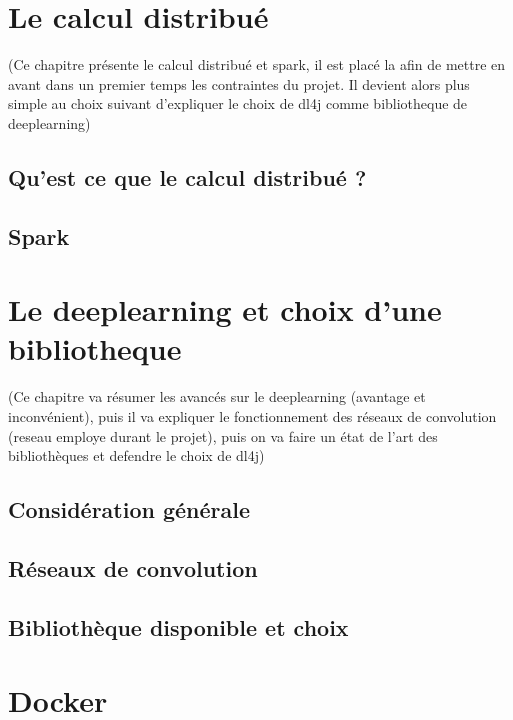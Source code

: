 \documentclass[a4paper,10pt,openany,oneside]{sphinxmanual}
\begin{document}
\section{Le calcul distribué}
\label{index:le-calcul-distribue}
(Ce chapitre présente le calcul distribué et spark, il est placé la afin de mettre en avant dans un
premier temps les contraintes du projet. Il devient alors plus simple au choix suivant d'expliquer le
choix de dl4j comme bibliotheque de deeplearning)


\subsection{Qu'est ce que le calcul distribué ?}
\label{index:qu-est-ce-que-le-calcul-distribue}

\subsection{Spark}
\label{index:spark}

\section{Le deeplearning et choix d'une bibliotheque}
\label{index:le-deeplearning-et-choix-d-une-bibliotheque}
(Ce chapitre va résumer les avancés sur le deeplearning (avantage et inconvénient), puis il va expliquer le fonctionnement des réseaux de convolution (reseau employe durant le projet), puis on va faire un état
de l'art des bibliothèques et defendre le choix de dl4j)


\subsection{Considération générale}
\label{index:consideration-generale}

\subsection{Réseaux de convolution}
\label{index:reseaux-de-convolution}

\subsection{Bibliothèque disponible et choix}
\label{index:bibliotheque-disponible-et-choix}

\section{Docker}
\label{index:docker}
\end{document}
